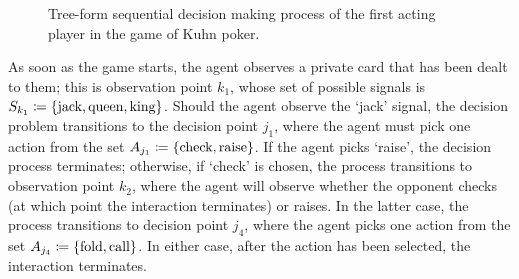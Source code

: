 \begin{figure}[th]
    \centering
    
    \caption{Tree-form sequential decision making process of the first
        acting player in the game of Kuhn poker.}
    \label{fig:kuhn}
\end{figure}

As soon as the game starts, the agent observes a private card that has been
dealt to them; this is observation point $k_1$, whose set of possible
signals is $S_{k_1} \coloneqq \{\text{jack},\text{queen},\text{king}\}$.
Should the agent observe the `jack' signal, the decision problem transitions to
the decision point $j_1$, where the agent must pick one action from the set
$A_{j_1} \coloneqq \{\text{check}, \text{raise}\}$.
If the agent picks `raise', the decision process terminates; otherwise, if
`check' is chosen, the process transitions to observation point $k_2$,
where the agent will observe whether the opponent checks (at which point
the interaction terminates) or raises.
In the latter case, the process transitions to decision point $j_4$, where the
agent picks one action from the set
$A_{j_4} \coloneqq \{\text{fold},\text{call}\}$.
In either case, after the action has been selected, the interaction terminates.


